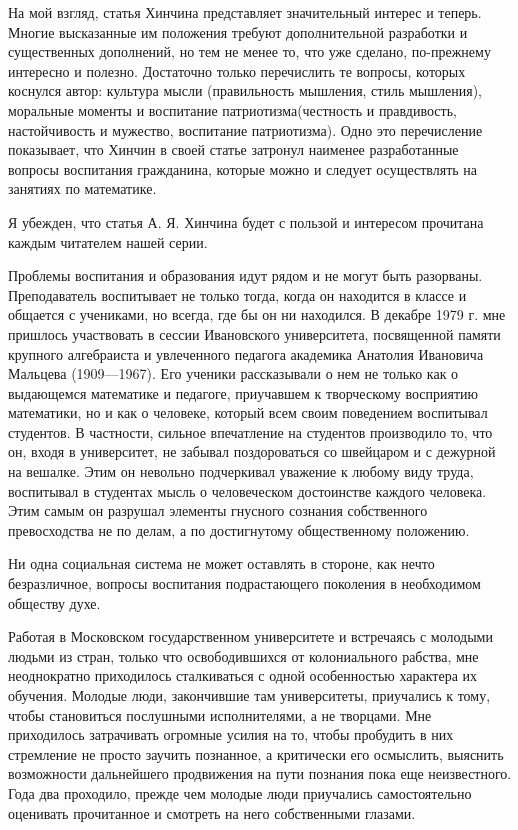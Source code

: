 \documentclass[12pt, a4paper, openany]{book}
\begin{document}
На мой взгляд, статья Хинчина представляет  значительный интерес и теперь. Многие высказанные им положения требуют дополнительной разработки и существенных  дополнений, но тем не менее то, что уже сделано, по-прежнему интересно и полезно. Достаточно только перечислить те вопросы, которых коснулся автор: культура мысли  (правильность мышления, стиль мышления), моральные  моменты и воспитание патриотизма(честность и  правдивость, настойчивость и мужество, воспитание патриотизма). Одно это  перечисление показывает, что Хинчин в своей статье затронул наименее разработанные вопросы воспитания гражданина, которые можно и следует осуществлять на занятиях по  математике. 

Я убежден, что статья А. Я. Хинчина будет с пользой и интересом прочитана каждым читателем нашей серии. 

Проблемы воспитания и образования идут рядом и не могут быть разорваны. Преподаватель воспитывает не только тогда, когда он находится в классе и общается с  учениками, но всегда, где бы он ни находился. В декабре 1979 г. мне пришлось участвовать в сессии Ивановского университета, посвященной памяти крупного алгебраиста и увлеченного педагога академика Анатолия Ивановича Мальцева (1909—1967). Его ученики рассказывали о нем не только как о выдающемся математике и педагоге,  приучавшем к творческому восприятию математики, но и как о человеке, который всем своим поведением воспитывал студентов. В частности, сильное впечатление на  студентов производило то, что он, входя в университет, не  забывал поздороваться со швейцаром и с дежурной на вешалке. Этим он невольно подчеркивал уважение к любому виду труда, воспитывал в студентах мысль о человеческом  достоинстве каждого человека. Этим самым он разрушал  элементы гнусного сознания собственного превосходства не по делам, а по достигнутому общественному положению. 

Ни одна социальная система не может оставлять в  стороне, как нечто безразличное, вопросы воспитания  подрастающего поколения в необходимом обществу духе. 

Работая в Московском государственном университете и встречаясь с молодыми людьми из стран, только что  освободившихся от колониального рабства, мне  неоднократно приходилось сталкиваться с одной особенностью  характера их обучения. Молодые люди, закончившие там  университеты, приучались к тому, чтобы становиться послушными исполнителями, а не творцами. Мне приходилось затрачивать огромные усилия на то, чтобы пробудить в них  стремление не просто заучить познанное, а критически его  осмыслить, выяснить возможности дальнейшего продвижения на пути познания пока еще неизвестного. Года два проходило, прежде чем молодые люди приучались самостоятельно оценивать прочитанное и смотреть на него собственными глазами. 
\end{document}
